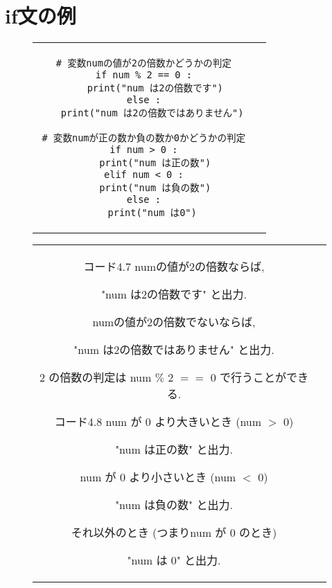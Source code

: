 \documentclass[dvipdfmx]{jsbook}
\begin{document}
\section{if文の例}
\begin{figure}[htp]
	\begin{tabular}{cc}
		\begin{minipage}[t]{.45\textwidth}
			\begin{lstlisting}[caption=if文の例-その1]
# 変数numの値が2の倍数かどうかの判定
if num % 2 == 0 :
	print("num は2の倍数です")
else :
	print("num は2の倍数ではありません") \end{lstlisting}
		\end{minipage} \hspace{5truemm}
		\begin{minipage}[t]{.45\textwidth}
			\begin{lstlisting}[caption=if文の例-その2]
# 変数numが正の数か負の数か0かどうかの判定
if num > 0 :
	print("num は正の数")
elif num < 0 :
	print("num は負の数")
else :
	print("num は0") \end{lstlisting}
		\end{minipage}
	\end{tabular}
\end{figure}
\vspace{-10truemm}
\begin{figure}[htp]
	\begin{tabular}{cc}
		\begin{minipage}[t]{.46\textwidth}
			\begin{itembox}[l]{コード4.7}
				numの値が2の倍数ならば,  \par "num は2の倍数です" と出力.  \par
				numの値が2の倍数でないならば,  \par "num は2の倍数ではありません" と出力. \par
				2 の倍数の判定は num $\%$ 2 $==$ 0 で行うことができる. \par
			\end{itembox}
		\end{minipage} \hspace{7truemm}
		\begin{minipage}[t]{.44\textwidth}
			\begin{itembox}[l]{コード4.8}
				num が 0 より大きいとき (num $>$ 0) \par "num は正の数" と出力.  \par
				num が 0 より小さいとき (num $<$ 0) \par "num は負の数" と出力.  \par
				それ以外のとき (つまりnum が 0 のとき) \par "num は 0" と出力.  \par
			\end{itembox}
		\end{minipage}
	\end{tabular}
\end{figure}
\end{document}
